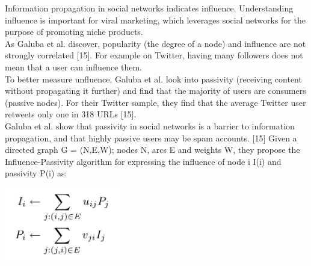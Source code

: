 \documentclass[conference,letterpaper]{IEEEtran}
\begin{document}
Information propagation in social networks indicates influence. Understanding influence is important for
viral marketing, which leverages social networks for the purpose of promoting niche products.\\
As Galuba et al. discover, popularity (the degree of a node) and influence are not strongly correlated [15].
For example on Twitter, having many followers does not mean that a user can influence them. \\
To better measure unfluence, Galuba et al. look into passivity (receiving content without propagating it further)
and find that the majority of users are consumers (passive nodes). For their Twitter sample, they find that the
average Twitter user retweets only one in 318 URLs [15]. \\
Galuba et al. show that passivity in social networks is a barrier to information propagation, and that highly
passive users may be spam accounts. [15] Given a directed graph G = (N,E,W); nodes N, arcs E and weights W,
they propose the Influence-Passivity algorithm for expressing the influence of node i I(i) and passivity P(i) as:\\

\centerline{
  \includegraphics[width=2.0in]{influence_passivity.png}
}
\end{document}
